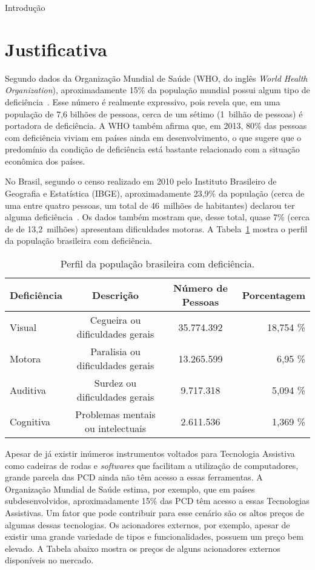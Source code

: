 \begin{chapter}{Introdução}
\section{Justificativa}

Segundo dados da Organização Mundial de Saúde (WHO, do inglês \textit{World
Health Organization}), aproximadamente 15\% da população mundial possui algum
tipo de deficiência~\cite{WHO15}. Esse número é realmente expressivo, pois
revela que, em uma população de 7,6 bilhões de pessoas, cerca de um sétimo
(1~bilhão de pessoas) é portadora de deficiência. A WHO também afirma que, em
2013, 80\% das pessoas com deficiência viviam em países ainda em
desenvolvimento, o que sugere que o predomínio da condição de deficiência está
bastante relacionado com a situação econômica dos países.

No Brasil, segundo o censo realizado em 2010 pelo Instituto Brasileiro de
Geografia e Estatística (IBGE), aproximadamente 23,9\% da população (cerca de
uma entre quatro pessoas, um total de 46~milhões de habitantes) declarou ter
alguma deficiência~\cite{tIBGE}. Os dados também mostram que, desse total, quase
7\% (cerca de de 13,2~milhões) apresentam dificuldades motoras. A
Tabela~\ref{tab:ibge} mostra o perfil da população brasileira com deficiência.

\begin{table}[!h]
\centering
\caption{Perfil da população brasileira com deficiência.}
\label{tab:ibge}
\def\arraystretch{1.25}
\begin{tabular}{lccr}
	\hline
	\hline
	\textbf{Deficiência} & \textbf{Descrição} & \textbf{Número de Pessoas} &
\textbf{Porcentagem} \\
	\hline
	Visual    & Cegueira ou dificuldades gerais   & 35.774.392  & 18,754 \%  \\
	Motora    & Paralisia ou dificuldades gerais  & 13.265.599  & 6,95 \% \\
	Auditiva  & Surdez ou dificuldades gerais     & 9.717.318   &  5,094 \%  \\
	Cognitiva & Problemas mentais ou intelectuais & 2.611.536   &  1,369 \%  \\ 
	\hline
	\hline
\end{tabular}
\end{table}

Apesar de já existir inúmeros instrumentos voltados para Tecnologia Assistiva
como cadeiras de rodas e \textit{softwares} que facilitam a utilização de
computadores, grande parcela das PCD ainda não têm acesso a essas ferramentas. A
Organização Mundial de Saúde estima, por exemplo, que em países
subdesenvolvidos, aproximadamente 15\% das PCD têm acesso a essas Tecnologias
Assistivas. Um fator que pode contribuir para esse cenário são os altos preços
de algumas dessas tecnologias. Os acionadores externos, por exemplo, apesar de
existir uma grande variedade de tipos e funcionalidades, possuem um preço bem
elevado. A Tabela abaixo mostra os preços de alguns acionadores externos
disponíveis no mercado.


\end{chapter}
